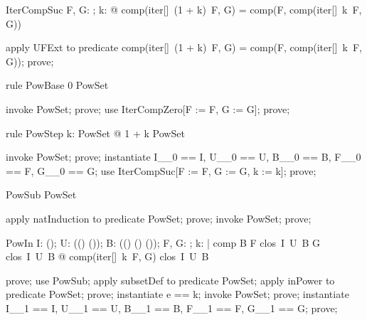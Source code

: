 \documentclass{article}
\begin{document}
\begin{theorem}{IterCompSuc}
  \forall F, G: \nat \fun \nat; k: \nat @ comp(iter[\nat]~(1 + k)~F, G) = comp(F, comp(iter[\nat]~k~F, G))
\end{theorem}

\begin{zproof}
apply UFExt to predicate comp(iter[\nat]~(1 + k)~F, G) = comp(F, comp(iter[\nat]~k~F, G));
prove;
\end{zproof}

\begin{theorem}{rule PowBase}
  0 \in PowSet
\end{theorem}

\begin{zproof}
invoke PowSet;
prove;
use IterCompZero[F := F, G := G];
prove;
\end{zproof}

\begin{theorem}{rule PowStep}
  \forall k: PowSet @ 1 + k \in PowSet
\end{theorem}

\begin{zproof}
invoke PowSet;
prove;
instantiate I\_\_0 == I, U\_\_0 == U, B\_\_0 == B, F\_\_0 == F, G\_\_0 == G;
use IterCompSuc[F := F, G := G, k := k];
prove;
\end{zproof}

\begin{theorem}{PowSub}
  \nat \subseteq PowSet
\end{theorem}

\begin{zproof}
apply natInduction to predicate \nat \subseteq PowSet;
prove;
invoke PowSet;
prove;
\end{zproof}

\begin{theorem}{PowIn}
  \forall I: \power (\nat \fun \nat); U: \power ((\nat \fun \nat) \fun (\nat \fun \nat)); B: \power ((\nat \fun \nat) \cross (\nat \fun \nat) \fun (\nat \fun \nat)); F, G: \nat \fun \nat; k: \nat |
    comp \in B \land F \in clos~I~U~B \land G \in clos~I~U~B @ comp(iter[\nat]~k~F, G) \in clos~I~U~B
\end{theorem}

\begin{zproof}
prove;
use PowSub;
apply subsetDef to predicate \nat \subseteq PowSet;
apply inPower to predicate \nat \in \power PowSet;
prove;
instantiate e == k;
invoke PowSet;
prove;
instantiate I\_\_1 == I, U\_\_1 == U, B\_\_1 == B, F\_\_1 == F, G\_\_1 == G;
prove;
\end{zproof}
\end{document}
